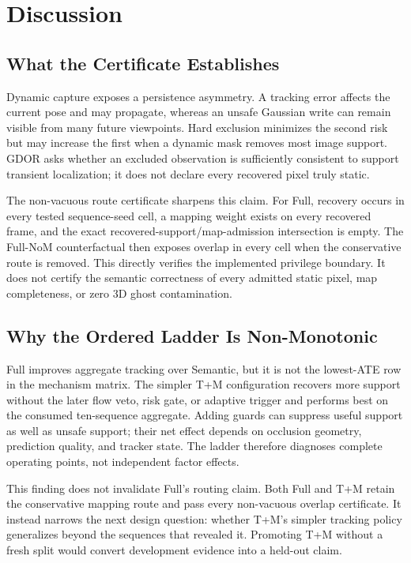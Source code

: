 \section{Discussion}

\subsection{What the Certificate Establishes}

Dynamic capture exposes a persistence asymmetry.
A tracking error affects the current pose and may propagate, whereas an unsafe Gaussian write can remain visible from many future viewpoints.
Hard exclusion minimizes the second risk but may increase the first when a dynamic mask removes most image support.
GDOR asks whether an excluded observation is sufficiently consistent to support transient localization; it does not declare every recovered pixel truly static.

The non-vacuous route certificate sharpens this claim.
For Full, recovery occurs in every tested sequence-seed cell, a mapping weight exists on every recovered frame, and the exact recovered-support/map-admission intersection is empty.
The Full-NoM counterfactual then exposes overlap in every cell when the conservative route is removed.
This directly verifies the implemented privilege boundary.
It does not certify the semantic correctness of every admitted static pixel, map completeness, or zero 3D ghost contamination.

\subsection{Why the Ordered Ladder Is Non-Monotonic}

Full improves aggregate tracking over Semantic, but it is not the lowest-ATE row in the mechanism matrix.
The simpler T+M configuration recovers more support without the later flow veto, risk gate, or adaptive trigger and performs best on the consumed ten-sequence aggregate.
Adding guards can suppress useful support as well as unsafe support; their net effect depends on occlusion geometry, prediction quality, and tracker state.
The ladder therefore diagnoses complete operating points, not independent factor effects.

This finding does not invalidate Full's routing claim.
Both Full and T+M retain the conservative mapping route and pass every non-vacuous overlap certificate.
It instead narrows the next design question: whether T+M's simpler tracking policy generalizes beyond the sequences that revealed it.
Promoting T+M without a fresh split would convert development evidence into a held-out claim.

